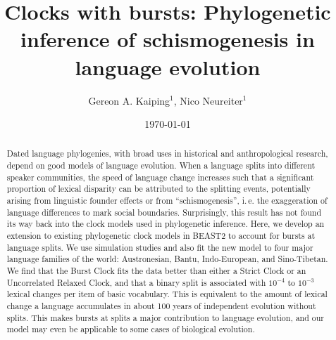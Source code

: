 \documentclass[]{rsos}%
\begin{document}
\title{Clocks with bursts: Phylogenetic inference of schismogenesis in language evolution}
\date{\today}
\author{
  Gereon A. Kaiping$^{1}$,
  Nico Neureiter$^{1}$}
\address{$^{1}$Geographic Information Science Center, Universität Zürich, CH}
\subject{Linguistics, Bioinformatics}


\begin{abstract}
Dated language phylogenies, with broad uses in historical and anthropological
research, depend on good models of language evolution.
When a language splits into different speaker communities, the speed of
language change increases such that a
significant proportion of lexical disparity can be attributed
to the splitting events, potentially arising from linguistic founder effects or from
“schis\-mo\-gen\-e\-sis”, i.\,e.
the exaggeration of language differences to mark social boundaries.
Surprisingly, this result has not found its way back
into the clock models used in phylogenetic inference. Here, we develop an
extension to existing phylogenetic clock models in BEAST2 to
account for bursts at language splits. We use simulation studies and also fit
the new model to four major language families of the world: Austronesian,
Bantu, Indo-European, and Sino-Tibetan. We find that the Burst Clock fits the
data better than either a Strict Clock or an Uncorrelated Relaxed Clock, and that
a binary split is associated with $10^{-4}$ to $10^{-3}$ lexical changes per item of basic
vocabulary. This is equivalent to the amount of lexical change a language
accumulates in about 100 years of independent evolution without splits.
This makes bursts at splits a major contribution to language evolution,
and our model may even be applicable to some cases of biological evolution.
\end{abstract}
\end{document}
